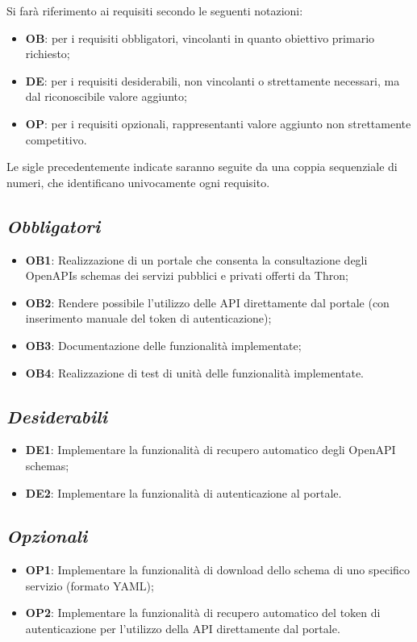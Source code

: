 Si farà riferimento ai requisiti secondo le seguenti notazioni:
\begin{itemize}
    \item \textbf{OB}: per i requisiti obbligatori, vincolanti in quanto obiettivo primario richiesto;
    \item \textbf{DE}: per i requisiti desiderabili, non vincolanti o strettamente necessari, ma dal riconoscibile valore aggiunto;
    \item \textbf{OP}: per i requisiti opzionali, rappresentanti valore aggiunto non strettamente competitivo.
\end{itemize}
Le sigle precedentemente indicate saranno seguite da una coppia sequenziale di numeri, che identificano univocamente ogni requisito.

\subsection*{\emph{Obbligatori}}
\begin{itemize}
    \item \textbf{OB1}: Realizzazione di un portale che consenta la consultazione degli OpenAPIs schemas dei servizi pubblici e privati offerti da Thron;
    \item \textbf{OB2}: Rendere possibile l'utilizzo delle API direttamente dal portale (con inserimento manuale del token di autenticazione);
    \item \textbf{OB3}: Documentazione delle funzionalità implementate;
    \item \textbf{OB4}: Realizzazione di test di unità delle funzionalità implementate.
\end{itemize}

\subsection*{\emph{Desiderabili}}
\begin{itemize}
    \item \textbf{DE1}:  Implementare la funzionalità di recupero automatico degli OpenAPI schemas;
    \item \textbf{DE2}: Implementare la funzionalità di autenticazione al portale.
\end{itemize}

\subsection*{\emph{Opzionali}}
\begin{itemize}
    \item \textbf{OP1}: Implementare la funzionalità di download dello schema di uno specifico servizio (formato YAML);
    \item \textbf{OP2}: Implementare la funzionalità di recupero automatico del token di autenticazione per l'utilizzo della API direttamente dal portale.
\end{itemize}

